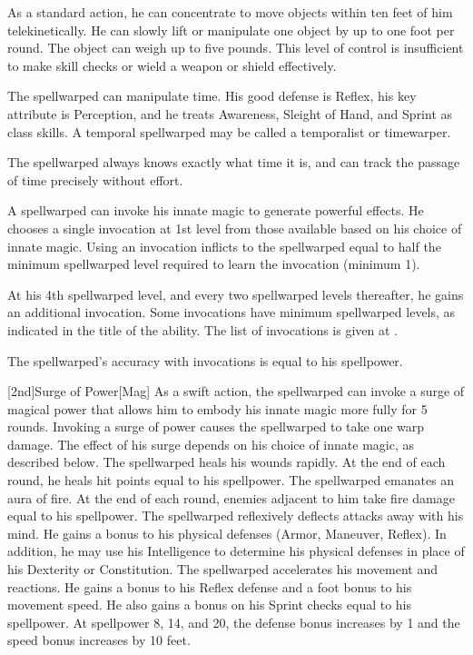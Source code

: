         As a standard action, he can concentrate to move objects within ten feet of him telekinetically.
        He can slowly lift or manipulate one object by up to one foot per round.
        The object can weigh up to five pounds.
        This level of control is insufficient to make skill checks or wield a weapon or shield effectively.

        The spellwarped can manipulate time.
        His good defense is Reflex, his key attribute is Perception, and he treats Awareness, Sleight of Hand, and Sprint as class skills.
        A temporal spellwarped may be called a temporalist or timewarper.

        The spellwarped always knows exactly what time it is, and can track the passage of time precisely without effort.

        A spellwarped can invoke his innate magic to generate powerful effects.
        He chooses a single invocation at 1st level from those available based on his choice of innate magic.
        Using an invocation inflicts  to the spellwarped equal to half the minimum spellwarped level required to learn the invocation (minimum 1).

        At his 4th spellwarped level, and every two spellwarped levels thereafter, he gains an additional invocation.
        Some invocations have minimum spellwarped levels, as indicated in the title of the ability.
        The list of invocations is given at .

        The spellwarped's accuracy with invocations is equal to his spellpower.

        [2nd]{Surge of Power}[Mag]
        As a swift action, the spellwarped can invoke a surge of magical power that allows him to embody his innate magic more fully for 5 rounds.
        Invoking a surge of power causes the spellwarped to take one warp damage.
        The effect of his surge depends on his choice of innate magic, as described below.
        The spellwarped heals his wounds rapidly.
        At the end of each round, he heals hit points equal to his spellpower.
        The spellwarped emanates an aura of fire.
        At the end of each round, enemies adjacent to him take fire damage equal to his spellpower.
        The spellwarped reflexively deflects attacks away with his mind.
        He gains a  bonus to his physical defenses (Armor, Maneuver, Reflex).
        In addition, he may use his Intelligence to determine his physical defenses in place of his Dexterity or Constitution.
        The spellwarped accelerates his movement and reactions.
        He gains a  bonus to his Reflex defense and a  foot bonus to his movement speed.
        He also gains a bonus on his Sprint checks equal to his spellpower.
        At spellpower 8, 14, and 20, the defense bonus increases by 1 and the speed bonus increases by 10 feet.

